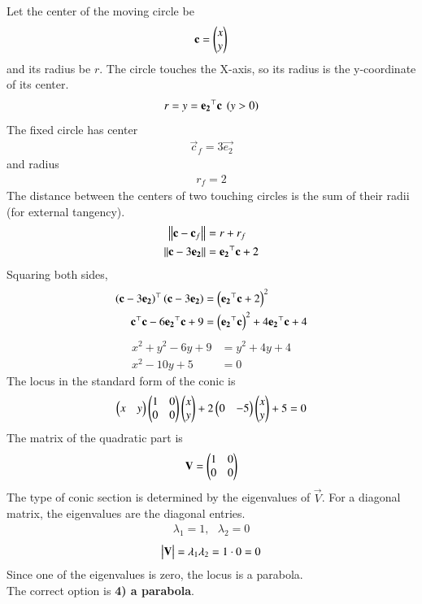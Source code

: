\documentclass[journal]{IEEEtran}
\begin{document}
Let the center of the moving circle be 
\begin{align*} 
    \mathbf{c} = \begin{pmatrix}x \\ y\end{pmatrix}
\end{align*}
and its radius be $r$.
The circle touches the X-axis, so its radius is the y-coordinate of its center.
\begin{align}
    r = y = \mathbf{e_2}^\top\mathbf{c} \text{ } \left(y>0\right)
\end{align}
The fixed circle has center 
\begin{align} 
    \vec{c}_f = 3\vec{e_2}
\end{align} 
and radius 
\begin{align}
    r_f=2
\end{align}
The distance between the centers of two touching circles is the sum of their radii (for external tangency).
\begin{align}
    \left\lVert\mathbf{c}-\mathbf{c}_f\right\rVert &= r + r_f \\
    \left\lVert\mathbf{c}-3\mathbf{e_2}\right\rVert &= \mathbf{e_2}^\top\mathbf{c} + 2
\end{align}
Squaring both sides,
\begin{align}
    \left(\mathbf{c}-3\mathbf{e_2}\right)^\top\left(\mathbf{c}-3\mathbf{e_2}\right) &= \left(\mathbf{e_2}^\top\mathbf{c} + 2\right)^2 \\
    \mathbf{c}^\top\mathbf{c} - 6\mathbf{e_2}^\top\mathbf{c} + 9 &= \left(\mathbf{e_2}^\top\mathbf{c}\right)^2 + 4\mathbf{e_2}^\top\mathbf{c} + 4
\end{align}
\begin{align}
    x^2 + y^2 - 6y + 9 &= y^2 + 4y + 4 \\
    x^2 - 10y + 5 &= 0
\end{align}
The locus in the standard form of the conic is
\begin{align}
    \begin{pmatrix}x & y\end{pmatrix}\begin{pmatrix}1 & 0 \\ 0 & 0\end{pmatrix}\begin{pmatrix}x \\ y\end{pmatrix} + 2\begin{pmatrix}0 & -5\end{pmatrix}\begin{pmatrix}x \\ y\end{pmatrix} + 5 = 0
\end{align}
The matrix of the quadratic part is
\begin{align}
    \mathbf{V} = \begin{pmatrix}1 & 0 \\ 0 & 0\end{pmatrix}
\end{align}
The type of conic section is determined by the eigenvalues of $\vec{V}$. For a diagonal matrix, the eigenvalues are the diagonal entries.
\begin{align}
    \lambda_1 = 1, \text{ } \lambda_2 = 0
\end{align}
\begin{align}
    \begin{vmatrix}\mathbf{V}\end{vmatrix} = \lambda_1\lambda_2 = 1 \cdot 0 = 0
\end{align}
Since one of the eigenvalues is zero, the locus is a parabola. \\
The correct option is \textbf{4) a parabola}.
\end{document}
